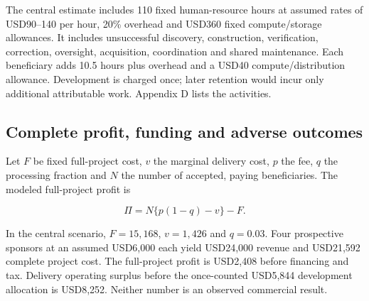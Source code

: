 \documentclass[11pt,a4paper]{article}
\begin{document}
The central estimate includes 110 fixed human-resource hours at assumed
rates of USD90--140 per hour, 20\% overhead and USD360 fixed
compute/storage allowances. It includes unsuccessful discovery,
construction, verification, correction, oversight, acquisition,
coordination and shared maintenance. Each beneficiary adds 10.5 hours
plus overhead and a USD40 compute/distribution allowance. Development is
charged once; later retention would incur only additional attributable
work. Appendix D lists the activities.


\hypertarget{complete-profit-funding-and-adverse-outcomes}{%
\subsection{Complete profit, funding and adverse
outcomes}\label{complete-profit-funding-and-adverse-outcomes}}

\begin{samepage}

Let \(F\) be fixed full-project cost, \(v\) the marginal delivery cost,
\(p\) the fee, \(q\) the processing fraction and \(N\) the number of
accepted, paying beneficiaries. The modeled full-project profit is

\[
\Pi=N\{p(1-q)-v\}-F.
\]

\end{samepage}

In the central scenario, \(F=15{,}168\), \(v=1{,}426\) and \(q=0.03\).
Four prospective sponsors at an assumed USD6,000 each yield USD24,000
revenue and USD21,592 complete project cost. The full-project profit is
USD2,408 before financing and tax. Delivery operating surplus before the
once-counted USD5,844 development allocation is USD8,252. Neither number
is an observed commercial result.
\end{document}
